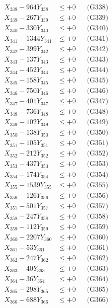 \documentclass[a4paper,10pt]{article}
\begin{document}
{\begin{align}
X_{338} - 964Y_{338} &\leq +0 && \text{(G338)} \\
X_{339} - 267Y_{339} &\leq +0 && \text{(G339)} \\
X_{340} - 330Y_{340} &\leq +0 && \text{(G340)} \\
\allowbreak
X_{341} - 1344Y_{341} &\leq +0 && \text{(G341)} \\
X_{342} - 399Y_{342} &\leq +0 && \text{(G342)} \\
X_{343} - 137Y_{343} &\leq +0 && \text{(G343)} \\
X_{344} - 452Y_{344} &\leq +0 && \text{(G344)} \\
X_{345} - 158Y_{345} &\leq +0 && \text{(G345)} \\
X_{346} - 750Y_{346} &\leq +0 && \text{(G346)} \\
X_{347} - 401Y_{347} &\leq +0 && \text{(G347)} \\
X_{348} - 736Y_{348} &\leq +0 && \text{(G348)} \\
X_{349} - 102Y_{349} &\leq +0 && \text{(G349)} \\
X_{350} - 138Y_{350} &\leq +0 && \text{(G350)} \\
\allowbreak
X_{351} - 105Y_{351} &\leq +0 && \text{(G351)} \\
X_{352} - 212Y_{352} &\leq +0 && \text{(G352)} \\
X_{353} - 437Y_{353} &\leq +0 && \text{(G353)} \\
X_{354} - 174Y_{354} &\leq +0 && \text{(G354)} \\
X_{355} - 1539Y_{355} &\leq +0 && \text{(G355)} \\
X_{356} - 126Y_{356} &\leq +0 && \text{(G356)} \\
X_{357} - 501Y_{357} &\leq +0 && \text{(G357)} \\
X_{358} - 247Y_{358} &\leq +0 && \text{(G358)} \\
X_{359} - 112Y_{359} &\leq +0 && \text{(G359)} \\
X_{360} - 2207Y_{360} &\leq +0 && \text{(G360)} \\
\allowbreak
X_{361} - 53Y_{361} &\leq +0 && \text{(G361)} \\
X_{362} - 247Y_{362} &\leq +0 && \text{(G362)} \\
X_{363} - 40Y_{363} &\leq +0 && \text{(G363)} \\
X_{364} - 36Y_{364} &\leq +0 && \text{(G364)} \\
X_{365} - 298Y_{365} &\leq +0 && \text{(G365)} \\
X_{366} - 688Y_{366} &\leq +0 && \text{(G366)} \\

\end{align}}
\end{document}
